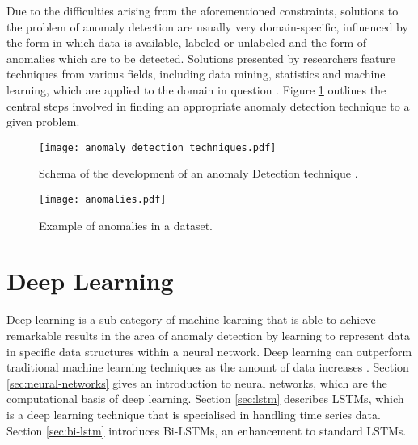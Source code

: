 Due to the difficulties arising from the aforementioned constraints, solutions to the problem of anomaly detection are usually very domain-specific, influenced by the form in which data is available, labeled or unlabeled and the form of anomalies which are to be detected. Solutions presented by researchers feature techniques from various fields, including data mining, statistics and machine learning, which are applied to the domain in question \cite{chandola2009anomaly}. Figure \ref{fig:anomaly_technique} outlines the central steps involved in finding an appropriate anomaly detection technique to a given problem.


\begin{figure}[h]
  \centering
\texttt{[image: anomaly\_detection\_techniques.pdf]}\\ 
  \caption{Schema of the development of an anomaly Detection technique \cite{chandola2009anomaly}.}
  \label{fig:anomaly_technique}
\end{figure}

\begin{figure}[h]
  \centering
  \texttt{[image: anomalies.pdf]}\\
  \caption{Example of anomalies in a dataset.}
  \label{fig:anomaly_dataset}
\end{figure}




\section{Deep Learning \label{sec:deep-learning}}
Deep learning is a sub-category of machine learning that is able to achieve remarkable results in the area of anomaly detection by learning to represent data in specific data structures within a neural network. Deep learning can outperform traditional machine learning techniques as the amount of data increases \cite{chalapathy2019deep}. Section \ref{sec:neural-networks} gives an introduction to neural networks, which are the computational basis of deep learning. Section \ref{sec:lstm} describes LSTMs, which is a deep learning technique that is specialised in handling time series data. Section \ref{sec:bi-lstm} introduces Bi-LSTMs, an enhancement to standard LSTMs.
